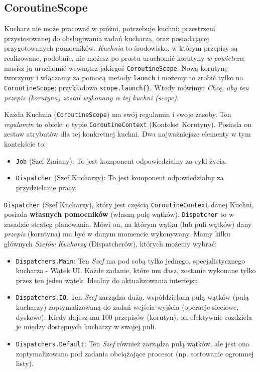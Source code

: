 \subsection{CoroutineScope}

Kucharz nie może pracować w próżni, potrzebuje kuchni; przestrzeni przystosowanej do obsługiwania zadań kucharza, oraz posiadającej przygotowanych pomocników. \textit{Kuchnia} to środowisko, w którym przepisy są realizowane, podobnie, nie możesz po prostu uruchomić korutyny \textit{w powietrzu}; musisz ją uruchomić wewnątrz jakiegoś \texttt{CoroutineScope}. Nową korutynę tworzymy i włączamy za pomocą metody \texttt{launch} i możemy to zrobić tylko na \texttt{CoroutineScope}; przykładowo \texttt{scope.launch\{\}}. Wtedy mówimy: \textit{Chcę, aby ten przepis (korutyna) został wykonany w tej kuchni (scope)}.

Każda Kuchnia (\texttt{CoroutineScope}) ma swój regulamin i swoje zasoby. Ten \textit{regulamin} to obiekt o typie \texttt{CoroutineContext} (Kontekst Korutyny). Posiada on zestaw atrybutów dla tej konkretnej kuchni. Dwa najważniejsze elementy w tym kontekście to:
\begin{itemize}
\item \texttt{Job} (Szef Zmiany): To jest komponent odpowiedzialny za cykl życia.
\item \texttt{Dispatcher} (Szef Kucharzy): To jest komponent odpowiedzialny za przydzielanie pracy.
\end{itemize}

\texttt{Dispatcher} (Szef Kucharzy), który jest częścią \texttt{CoroutineContext} danej Kuchni, posiada \textbf{własnych pomocników} (własną pulę wątków). \texttt{Dispatcher} to w zasadzie strateg planowania. Mówi on, na którym wątku (lub puli wątków) dany \textit{przepis} (korutyna) ma być w danym momencie wykonywany. Mamy kilku głównych \textit{Szefów Kucharzy} (Dispatcherów), których możemy wybrać:
\begin{itemize}
\item \texttt{Dispatchers.Main}: Ten \textit{Szef} ma pod sobą tylko jednego, specjalistycznego kucharza - Wątek UI. Każde zadanie, które mu dasz, zostanie wykonane tylko przez ten jeden wątek. Idealny do aktualizowania interfejsu.
\item \texttt{Dispatchers.IO}: Ten \textit{Szef} zarządza dużą, współdzieloną pulą wątków (pulą kucharzy) zoptymalizowaną do zadań wejścia-wyjścia (operacje sieciowe, dyskowe). Kiedy dajesz mu 100 przepisów (korutyn), on efektywnie rozdziela je między dostępnych kucharzy w swojej puli.
\item \texttt{Dispatchers.Default}: Ten \textit{Szef} również zarządza pulą wątków, ale jest ona zoptymalizowana pod zadania obciążające procesor (np. sortowanie ogromnej listy).
\end{itemize}

